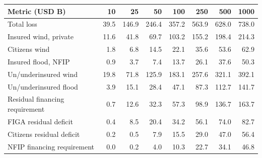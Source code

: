 \begin{tabular}{lrrrrrrr}
\toprule
Metric (USD B) & 10 & 25 & 50 & 100 & 250 & 500 & 1000 \\
\midrule
Total loss & 39.5 & 146.9 & 246.4 & 357.2 & 563.9 & 628.0 & 738.0 \\
Insured wind, private & 11.6 & 41.8 & 69.7 & 103.2 & 155.2 & 198.4 & 214.3 \\
Citizens wind & 1.8 & 6.8 & 14.5 & 22.1 & 35.6 & 53.6 & 62.9 \\
Insured flood, NFIP & 0.9 & 3.7 & 7.4 & 13.7 & 26.1 & 37.6 & 50.3 \\
Un/underinsured wind & 19.8 & 71.8 & 125.9 & 183.1 & 257.6 & 321.1 & 392.1 \\
Un/underinsured flood & 3.9 & 15.1 & 28.4 & 47.1 & 87.3 & 112.7 & 141.7 \\
\midrule
Residual financing requirement & 0.7 & 12.6 & 32.3 & 57.3 & 98.9 & 136.7 & 163.7 \\
FIGA residual deficit & 0.4 & 8.5 & 20.4 & 34.2 & 56.1 & 74.0 & 82.7 \\
Citizens residual deficit & 0.2 & 0.5 & 7.9 & 15.5 & 29.0 & 47.0 & 56.4 \\
NFIP financing requirement & 0.0 & 0.2 & 4.0 & 10.3 & 22.7 & 34.1 & 46.8 \\
\bottomrule
\end{tabular}
